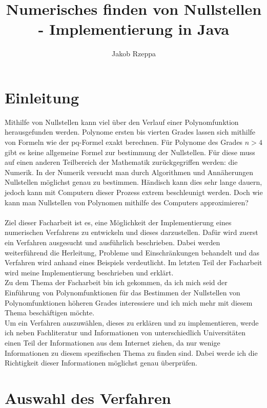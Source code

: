 \documentclass[12pt]{article}
\title{Numerisches finden von Nullstellen - Implementierung in Java}
\author{Jakob Rzeppa}
\begin{document}
\tableofcontents

\section{Einleitung}
Mithilfe von Nullstellen kann viel über den Verlauf einer Polynomfunktion herausgefunden werden. Polynome ersten bis vierten Grades lassen sich mithilfe von Formeln wie der pq-Formel exakt berechnen. Für Polynome des Grades $n > 4$ gibt es keine allgemeine Formel zur bestimmung der Nullstellen. Für diese muss auf einen anderen Teilbereich der Mathematik zurückgegriffen werden: die Numerik. In der Numerik versucht man durch Algorithmen und Annäherungen Nullstellen möglichst genau zu bestimmen. Händisch kann dies sehr lange dauern, jedoch kann mit Computern dieser Prozess extrem beschleunigt werden. Doch wie kann man Nullstellen von Polynomen mithilfe des Computers approximieren?\\
\\
Ziel dieser Facharbeit ist es, eine Möglichkeit der Implementierung eines numerischen Verfahrens zu entwickeln und dieses darzustellen. Dafür wird zuerst ein Verfahren ausgesucht und ausführlich beschrieben. Dabei werden weiterführend die Herleitung, Probleme und Einschränkungen behandelt und das Verfahren wird anhand eines Beispiels verdeutlicht. Im letzten Teil der Facharbeit wird meine Implementierung beschrieben und erklärt.\\
Zu dem Thema der Facharbeit bin ich gekommen, da ich mich seid der Einführung von Polynomfunktionen für das Bestimmen der Nullstellen von Polynomfunktionen höheren Grades interessiere und ich mich mehr mit diesem Thema beschäftigen möchte.
\\
Um ein Verfahren auszuwählen, dieses zu erklären und zu implementieren, werde ich neben Fachliteratur und Informationen von unterschiedlich Universitäten einen Teil der Informationen aus dem Internet ziehen, da nur wenige Informationen zu diesem spezifischen Thema zu finden sind. Dabei werde ich die Richtigkeit dieser Informationen möglichst genau überprüfen.

\section{Auswahl des Verfahren}
\end{document}
